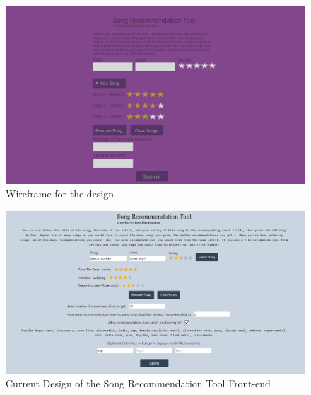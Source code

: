 \documentclass{l4proj}
\begin{document}
\begin{figure}
    \centering
    \includegraphics[width=1.0\linewidth]{images/Songs Added.png}
    \caption{Wireframe for the design}
    \label{fig:wireframe}
\end{figure}
\begin{figure}
    \centering
    \includegraphics[width=1.0\linewidth]{images/actual_design.png}
    \caption{Current Design of the Song Recommendation Tool Front-end}
    \label{fig:design}
\end{figure}
\end{document}
